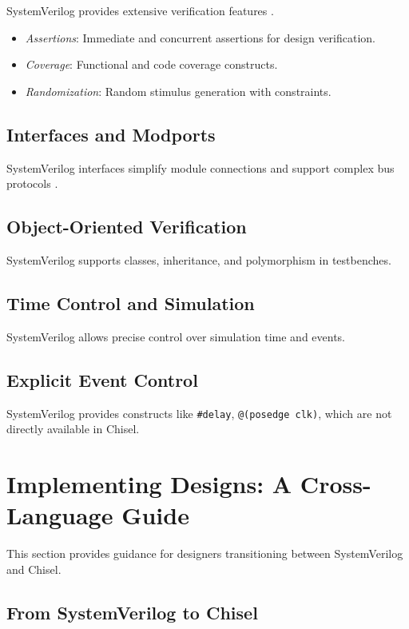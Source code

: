 SystemVerilog provides extensive verification features \cite{foster2003assertions}.

\begin{itemize}
    \item \textit{Assertions}: Immediate and concurrent assertions for design verification.
    \item \textit{Coverage}: Functional and code coverage constructs.
    \item \textit{Randomization}: Random stimulus generation with constraints.
\end{itemize}

\subsection{Interfaces and Modports}

SystemVerilog interfaces simplify module connections and support complex bus protocols \cite{guyer2005introduction}.

\subsection{Object-Oriented Verification}

SystemVerilog supports classes, inheritance, and polymorphism in testbenches.

\subsection{Time Control and Simulation}

SystemVerilog allows precise control over simulation time and events.

\subsection{Explicit Event Control}

SystemVerilog provides constructs like \texttt{\#delay}, \texttt{@(posedge clk)}, which are not directly available in Chisel.

\section{Implementing Designs: A Cross-Language Guide}

This section provides guidance for designers transitioning between SystemVerilog and Chisel.

\subsection{From SystemVerilog to Chisel}

